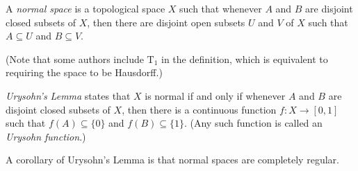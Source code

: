 \documentclass{article}
\begin{document}

A \emph{normal space} is a topological space $X$
such that whenever $A$ and $B$ are disjoint closed subsets of $X$,
then there are disjoint open subsets $U$ and $V$ of $X$
such that $A\subseteq U$ and $B\subseteq V$.

(Note that some authors include $\mathrm{T}_1$ in the definition,
which is equivalent to requiring the space to be Hausdorff.)

\emph{Urysohn's Lemma} states that $X$ is normal
if and only if
whenever $A$ and $B$ are disjoint closed subsets of $X$,
then there is a continuous function $f\colon X\to[0,1]$
such that $f(A)\subseteq\{0\}$ and $f(B)\subseteq\{1\}$.
(Any such function is called an \emph{Urysohn function}.)

A corollary of Urysohn's Lemma
is that normal  spaces are completely regular.
\end{document}
